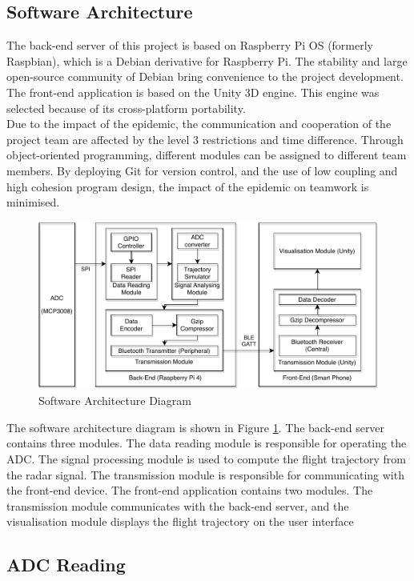 \subsection{Software Architecture}
The back-end server of this project is based on Raspberry Pi OS (formerly Raspbian), which is a Debian derivative for Raspberry Pi. The stability and large open-source community of Debian bring convenience to the project development. The front-end application is based on the Unity 3D engine. This engine was selected because of its cross-platform portability.
\\
Due to the impact of the epidemic, the communication and cooperation of the project team are affected by the level 3 restrictions and time difference. Through object-oriented programming, different modules can be assigned to different team members. By deploying Git for version control, and the use of low coupling and high cohesion program design, the impact of the epidemic on teamwork is minimised.
\begin{figure}[H]
    \centering
    \includegraphics[width=\textwidth]{figure/Software.pdf}
    \caption{Software Architecture Diagram}
    \label{fig:software_diagram}
\end{figure}
The software architecture diagram is shown in Figure \ref{fig:software_diagram}. The back-end server contains three modules. The data reading module is responsible for operating the ADC. The signal processing module is used to compute the flight trajectory from the radar signal. The transmission module is responsible for communicating with the front-end device. The front-end application contains two modules. The transmission module communicates with the back-end server, and the visualisation module displays the flight trajectory on the user interface
\subsection{ADC Reading}
